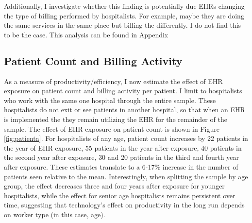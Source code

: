 \documentclass[12pt]{article}
\begin{document}
Additionally, I investigate whether this finding is potentially due EHRs changing the type of billing performed by hospitalists. For example, maybe they are doing the same services in the same place but billing the differently. I do not find this to be the case. This analysis can be found in Appendix 


\subsection{Patient Count and Billing Activity}\label{sec:patientcount}

As a measure of productivity/efficiency, I now estimate the effect of EHR exposure on patient count and billing activity per patient. I limit to hospitalists who work with the same one hospital through the entire sample. These hospitalists do not exit or see patients in another hospital, so that when an EHR is implemented the they remain utilizing the EHR for the remainder of the sample. The effect of EHR exposure on patient count is shown in Figure \ref{fig:patienta}. For hospitalists of any age, patient count increases by 22 patients in the year of EHR exposure, 55 patients in the year after exposure, 40 patients in the second year after exposure, 30 and 20 patients in the third and fourth year after exposure. These estimates translate to a 6-17\% increase in the number of patients seen relative to the mean. Interestingly, when splitting the sample by age group, the effect decreases three and four years after exposure for younger hospitalists, while the effect for senior age hospitalists remains persistent over time, suggesting that technology's effect on productivity in the long run depends on worker type (in this case, age). 
\end{document}
